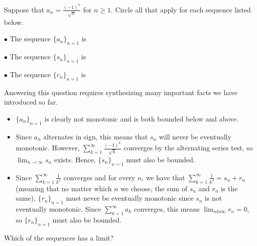 \documentclass{ximera}
\author{Jim Talamo}
\begin{document}
\begin{exercise}

Suppose that $a_n = \frac{(-1)^n}{\sqrt{n}}$ for $n \geq 1$. Circle all that apply for each sequence listed below.

$\bullet$ The sequence $\{a_n\}_{n=1}$ is
\begin{selectAll}
\end{selectAll}

$\bullet$ The sequence $\{s_n\}_{n=1}$ is
\begin{selectAll}
\end{selectAll}

$\bullet$ The sequence $\{r_n\}_{n=1}$ is
\begin{selectAll}
\end{selectAll}

\begin{hint}
Answering this question requires synthesizing many important facts we have introduced so far.

\begin{itemize}
\item $\{a_n\}_{n=1}$ is clearly not monotonic and is both bounded below and above.  
\item Since $a_n$ alternates in sign, this means that $s_n$ will never be eventually monotonic.  However, $\sum_{k=1}^{\infty} \frac{(-1)^k}{\sqrt{k}}$ converges by the alternating series test, so $\lim_{n \to \infty} s_n$ exists.  Hence, $\{s_n\}_{n=1}$ must also be bounded.
\item Since $\sum_{k=1}^{\infty} \frac{1}{k^2}$ converges and for every $n$, we have that $\sum_{k=1}^{\infty} \frac{1}{k^2} = s_n +r_n$ (meaning that no matter which $n$ we choose, the sum of $s_n$ and $r_n$ is the same), $\{r_n\}_{n=1}$ must never be eventually monotonic  since $s_n$ is not eventually monotonic.  Since $\sum_{k=1}^{\infty} a_k$ converges, this means $\lim_{n to \infty} r_n =0$, so $\{r_n\}_{n=1}$ must also be bounded.
\end{itemize}

\end{hint}

\begin{exercise}
Which of the sequences has a limit?
\begin{selectAll}
\end{selectAll}
\end{exercise}

\end{exercise}
\end{document}
